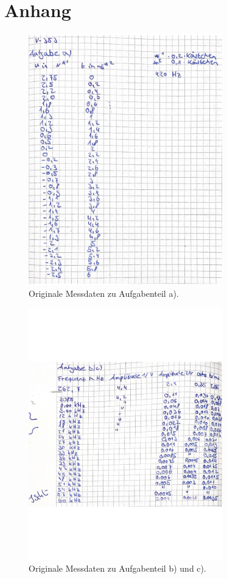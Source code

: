 \section{Anhang}
\label{sec:Anhang}

\begin{figure}[H]
    \centering
    \includegraphics[width=0.75\textwidth]{Dateien/daten1.jpg}
    \caption{Originale Messdaten zu Aufgabenteil a).}
    \label{fig:daten1}
\end{figure}

\begin{figure}[H]
    \centering
    \includegraphics[width=0.75\textwidth]{Dateien/daten2.jpg}
    \caption{Originale Messdaten zu Aufgabenteil b) und c).}
    \label{fig:daten2}
\end{figure}